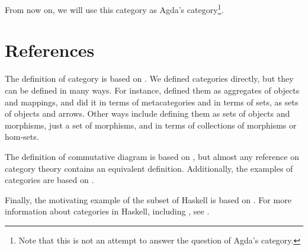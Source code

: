 From now on, we will use this category as Agda's
category\footnote{Note that this is not an attempt to answer the
  question of Agda's category.}.

\section{References}
\label{sec:categories-references}

The definition of category is based on
\parencites[4--5]{awodey-2010}[7--8, 289]{maclane-1998}. We defined
categories directly, but they can be defined in many ways. For
instance, \textcite{eilenberg-maclane-1945} defined them as aggregates
of objects and mappings, and \textcite{maclane-1998} did it in terms
of metacategories and in terms of sets, as sets of objects and arrows.
Other ways include defining them as sets of objects and morphisms,
just a set of morphisms, and in terms of collections of morphisms or
hom-sets.

The definition of commutative diagram is based on
\parencites[8]{maclane-1998}[434--435]{poigne-1992}, but almost any
reference on category theory contains an equivalent definition.
Additionally, the examples of categories are based on
\parencites[7--8]{awodey-2010}[8--12, 21]{maclane-1998}[Example
  1.1.14]{pierce-1991}[§ 1.2.2]{poigne-1992}.

Finally, the motivating example of the subset of Haskell is based on
\parencites[Example 1.1.15]{pierce-1991}[7--11]{pitt-1986}. For more
information about categories in Haskell, including \hask, see
\parencites[74]{elkins-2009}[49--51]{yorgey-2009}.

\clearemptydoublepage
